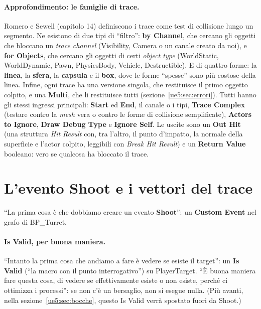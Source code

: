 \paragraph{Approfondimento: le famiglie di trace.} Romero e Sewell (capitolo 14)
definiscono i trace come test di collisione lungo un segmento. Ne esistono di due
tipi di ``filtro'': \textbf{by Channel}, che cercano gli oggetti che bloccano un
\emph{trace channel} (Visibility, Camera o un canale creato da noi), e \textbf{for
Objects}, che cercano gli oggetti di certi \emph{object type} (WorldStatic,
WorldDynamic, Pawn, PhysicsBody, Vehicle, Destructible). E di quattro forme: la
\textbf{linea}, la \textbf{sfera}, la \textbf{capsula} e il \textbf{box}, dove le forme
``spesse'' sono più costose della linea. Infine, ogni trace ha una versione singola,
che restituisce il primo oggetto colpito, e una \textbf{Multi}, che li restituisce
tutti (sezione~\ref{ue5:sec:errori}). Tutti hanno gli stessi ingressi principali:
\textbf{Start} ed \textbf{End}, il canale o i tipi, \textbf{Trace Complex} (testare
contro la \emph{mesh} vera o contro le forme di collisione semplificate), \textbf{Actors
to Ignore}, \textbf{Draw Debug Type} e \textbf{Ignore Self}. Le uscite sono un
\textbf{Out Hit} (una struttura \emph{Hit Result} con, tra l'altro, il punto d'impatto,
la normale della superficie e l'actor colpito, leggibili con \emph{Break Hit Result}) e
un \textbf{Return Value} booleano: vero se qualcosa ha bloccato il trace.

\section{L'evento Shoot e i vettori del trace}
\label{ue5:sec:shoot}

``La prima cosa è che dobbiamo creare un evento \textbf{Shoot}'': un \textbf{Custom
Event} nel grafo di BP\_Turret.

\paragraph{Is Valid, per buona maniera.} ``Intanto la prima cosa che andiamo a fare è
vedere se esiste il target'': un \textbf{Is Valid} (``la macro con il punto
interrogativo'') su PlayerTarget. ``È buona maniera fare questa cosa, di vedere se
effettivamente esiste o non esiste, perché ci ottimizza i processi'': se non c'è un
bersaglio, non si esegue nulla. (Più avanti, nella sezione~\ref{ue5:sec:bocche}, questo
Is Valid verrà spostato fuori da Shoot.)

